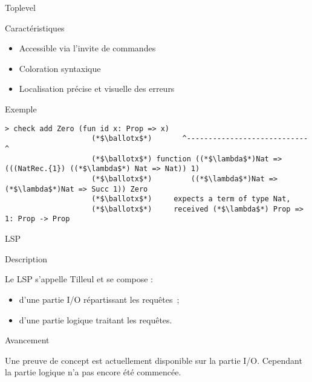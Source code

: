 \documentclass[12pt, aspectratio=169]{beamer}
\begin{document}
        \begin{frame}[fragile]{Toplevel}

            \begin{block}{Caractéristiques}

                \begin{itemize}
                    \item Accessible via l'invite de commandes \pause
                    \item Coloration syntaxique \pause
                    \item Localisation précise et visuelle des erreurs
                \end{itemize}

            \end{block} \pause

            \begin{block}{Exemple}

                \begin{lstlisting}[language=mdln]
                    > check add Zero (fun id x: Prop => x)
                    (*$\ballotx$*)       ^----------------------------^
                    (*$\ballotx$*) function ((*$\lambda$*)Nat => (((NatRec.{1}) ((*$\lambda$*) Nat => Nat)) 1)
                    (*$\ballotx$*)         ((*$\lambda$*)Nat => (*$\lambda$*)Nat => Succ 1)) Zero
                    (*$\ballotx$*)     expects a term of type Nat,
                    (*$\ballotx$*)     received (*$\lambda$*) Prop => 1: Prop -> Prop
                \end{lstlisting}

            \end{block}

        \end{frame}

        \begin{frame}{LSP}

            \begin{block}{Description}

                Le LSP s'appelle Tilleul et se compose : \pause

                \begin{itemize}
                    \item d'une partie I/O répartissant les requêtes~; \pause
                    \item d'une partie logique traitant les requêtes.
                \end{itemize}

            \end{block}

            \vspace{.3cm}
            \pause

            \begin{block}{Avancement}

                Une preuve de concept est actuellement disponible sur la partie I/O. Cependant la partie logique n'a pas encore été commencée.

            \end{block}

        \end{frame}
\end{document}

